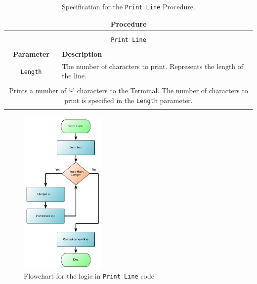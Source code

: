 \begin{table}[h]
  \centering
  \begin{tabular}{|c|p{9cm}|}
    \hline
    \multicolumn{2}{|c|}{\textbf{Procedure}} \\
    \hline
    \multicolumn{2}{|c|}{} \\
    \multicolumn{2}{|c|}{\texttt{Print Line}} \\
    \multicolumn{2}{|c|}{} \\
    \hline
    \textbf{Parameter} & \textbf{Description} \\
    \hline
    \texttt{Length} & The number of characters to print. Represents the length of the line. \\
    \hline
    \multicolumn{2}{|c|}{} \\
    \multicolumn{2}{|p{12cm}|}{Prints a number of `-' characters to the Terminal. The number of characters to print is specified in the \texttt{Length} parameter.} \\
    \multicolumn{2}{|c|}{} \\
    \hline
  \end{tabular}
  \caption{Specification for the \texttt{Print Line} Procedure.}
  \label{tbl:print line}
\end{table}

\begin{figure}[htbp]
   \centering
   \includegraphics[width=0.37\textwidth]{./topics/control-flow/diagrams/PrintLine} 
   \caption{Flowchart for the logic in \texttt{Print Line} code}
   \label{fig:print-line}
\end{figure}

\clearpage

